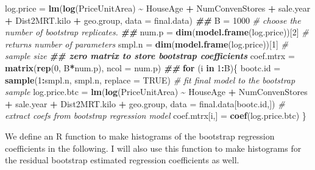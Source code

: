 \documentclass[
]{book}
\newenvironment{Shaded}{\begin{snugshade}}{\end{snugshade}}
\newcommand{\AttributeTok}[1]{\textcolor[rgb]{0.13,0.29,0.53}{#1}}
\newcommand{\CommentTok}[1]{\textcolor[rgb]{0.56,0.35,0.01}{\textit{#1}}}
\newcommand{\ConstantTok}[1]{\textcolor[rgb]{0.56,0.35,0.01}{#1}}
\newcommand{\ControlFlowTok}[1]{\textcolor[rgb]{0.13,0.29,0.53}{\textbf{#1}}}
\newcommand{\DecValTok}[1]{\textcolor[rgb]{0.00,0.00,0.81}{#1}}
\newcommand{\DocumentationTok}[1]{\textcolor[rgb]{0.56,0.35,0.01}{\textbf{\textit{#1}}}}
\newcommand{\FunctionTok}[1]{\textcolor[rgb]{0.13,0.29,0.53}{\textbf{#1}}}
\newcommand{\NormalTok}[1]{#1}
\newcommand{\OtherTok}[1]{\textcolor[rgb]{0.56,0.35,0.01}{#1}}
\newcommand{\SpecialCharTok}[1]{\textcolor[rgb]{0.81,0.36,0.00}{\textbf{#1}}}
\begin{document}
\begin{Shaded}
\begin{Highlighting}[]
\NormalTok{log.price }\OtherTok{=} \FunctionTok{lm}\NormalTok{(}\FunctionTok{log}\NormalTok{(PriceUnitArea) }\SpecialCharTok{\textasciitilde{}}\NormalTok{ HouseAge }\SpecialCharTok{+}\NormalTok{ NumConvenStores }\SpecialCharTok{+}\NormalTok{ sale.year }\SpecialCharTok{+}  
\NormalTok{                 Dist2MRT.kilo  }\SpecialCharTok{+}\NormalTok{ geo.group, }\AttributeTok{data =}\NormalTok{ final.data)}
\DocumentationTok{\#\#}
\NormalTok{B }\OtherTok{=} \DecValTok{1000}    \CommentTok{\# choose the number of bootstrap replicates.}
\DocumentationTok{\#\# }
\NormalTok{num.p }\OtherTok{=} \FunctionTok{dim}\NormalTok{(}\FunctionTok{model.frame}\NormalTok{(log.price))[}\DecValTok{2}\NormalTok{]  }\CommentTok{\# returns number of parameters }
\NormalTok{smpl.n }\OtherTok{=} \FunctionTok{dim}\NormalTok{(}\FunctionTok{model.frame}\NormalTok{(log.price))[}\DecValTok{1}\NormalTok{] }\CommentTok{\# sample size}
\DocumentationTok{\#\# zero matrix to store bootstrap coefficients }
\NormalTok{coef.mtrx }\OtherTok{=} \FunctionTok{matrix}\NormalTok{(}\FunctionTok{rep}\NormalTok{(}\DecValTok{0}\NormalTok{, B}\SpecialCharTok{*}\NormalTok{num.p), }\AttributeTok{ncol =}\NormalTok{ num.p)       }
\DocumentationTok{\#\# }
\ControlFlowTok{for}\NormalTok{ (i }\ControlFlowTok{in} \DecValTok{1}\SpecialCharTok{:}\NormalTok{B)\{}
\NormalTok{  bootc.id }\OtherTok{=} \FunctionTok{sample}\NormalTok{(}\DecValTok{1}\SpecialCharTok{:}\NormalTok{smpl.n, smpl.n, }\AttributeTok{replace =} \ConstantTok{TRUE}\NormalTok{) }
  \CommentTok{\# fit final model to the bootstrap sample}
\NormalTok{  log.price.btc }\OtherTok{=} \FunctionTok{lm}\NormalTok{(}\FunctionTok{log}\NormalTok{(PriceUnitArea) }\SpecialCharTok{\textasciitilde{}}\NormalTok{ HouseAge }\SpecialCharTok{+}\NormalTok{ NumConvenStores }\SpecialCharTok{+}\NormalTok{ sale.year }\SpecialCharTok{+}  
\NormalTok{                       Dist2MRT.kilo  }\SpecialCharTok{+}\NormalTok{ geo.group, }\AttributeTok{data =}\NormalTok{ final.data[bootc.id,])  }
  \CommentTok{\# extract coefs from bootstrap regression model  }
\NormalTok{  coef.mtrx[i,] }\OtherTok{=} \FunctionTok{coef}\NormalTok{(log.price.btc)      }
\NormalTok{\}}
\end{Highlighting}
\end{Shaded}

We define an R function to make histograms of the bootstrap regression coefficients in the following. I will also use this function to make histograms for the residual bootstrap estimated regression coefficients as well.
\end{document}

